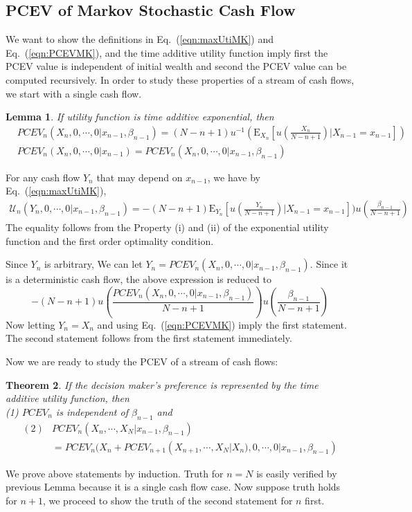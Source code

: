 \documentclass{article}[12pt letter]
\newtheorem{theorem}{Theorem}
\newtheorem{lemma}[theorem]{Lemma}
\newcommand{\E}{\mathrm{E}}
\begin{document}
\subsection{PCEV of Markov Stochastic Cash Flow}
We want to show the definitions in Eq.~(\ref{eqn:maxUtiMK}) and Eq.~(\ref{eqn:PCEVMK}), and the time additive utility function imply  first the PCEV value is independent of initial wealth and second the PCEV value can be computed recursively. In order to study these properties of a stream of cash flows, we start with a single cash flow.
\begin{lemma}\label{lem:oneCF-PCEV}
If utility function is time additive exponential, then
\begin{align}
&PCEV_n(X_n, 0,\cdots,0|x_{n-1},\beta_{n-1}) = (N-n+1)u^{-1}(\E_{X_n}[u(\frac{X_n}{N-n+1})|X_{n-1}=x_{n-1}]) \\
&PCEV_n(X_n,0,\cdots,0|x_{n-1}) = PCEV_n(X_n,0,\cdots,0|x_{n-1},\beta_{n-1})
\end{align}
\end{lemma}
\proof For any cash flow $Y_n$ that may depend on $x_{n-1}$, we have by Eq.~(\ref{eqn:maxUtiMK}),
\begin{align}
\mathcal{U}_n(Y_n,0,\cdots,0|x_{n-1},\beta_{n-1}) =  -(N-n+1)\E_{Y_n}[u(\frac{Y_n}{N-n+1})|X_{n-1}=x_{n-1}]) u(\frac{\beta_{n-1}}{N-n+1})
\end{align}
The equality follows from the Property (i) and (ii) of the exponential utility function and the first order optimality condition.

Since $Y_n$ is arbitrary, We can let $Y_n = PCEV_n(X_n,0,\cdots,0|x_{n-1},\beta_{n-1})$. Since it is a deterministic cash flow, the above expression is reduced to
\[-(N-n+1)u(\frac{ PCEV_n(X_n,0,\cdots,0|x_{n-1},\beta_{n-1})}{N-n+1}) u(\frac{\beta_{n-1}}{N-n+1}) \]
Now letting $Y_n = X_n$ and using Eq.~(\ref{eqn:PCEVMK}) imply the first statement. The second statement follows from the first statement immediately.
\endproof

Now we are ready to study the PCEV of a stream of cash flows:

\begin{theorem}\label{theo:PCEVMK}
If the decision maker's preference is represented by the time additive utility function, then\\
(1) $PCEV_n$ is independent of $\beta_{n-1}$ and
\begin{align}
(2) &PCEV_n(X_n,\cdots,X_N|x_{n-1}, \beta_{n-1}) \nonumber \\&= PCEV_n(X_n + PCEV_{n+1}(X_{n+1},\cdots,X_N|X_n), 0,\cdots,0|x_{n-1},\beta_{n-1})
\end{align}
\end{theorem}
\proof
We prove above statements by induction. Truth for $n=N$ is easily verified by previous Lemma because it is a single cash flow case. Now suppose truth holds for $n+1$, we proceed to show the truth of the second statement for $n$ first.
\end{document}
